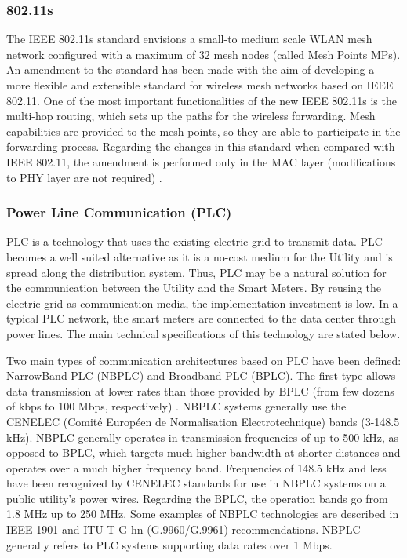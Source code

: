\documentclass[10pt,twocolumn,twoside,submit]{JCNtran}
\begin{document}
\subsubsection{802.11s}\label{tech::80211s}

The IEEE 802.11s standard envisions a small-to medium scale WLAN mesh network configured with a maximum of 32 mesh nodes (called Mesh Points MPs). An amendment to the standard has been made with the aim of developing a more flexible and extensible standard for wireless mesh networks based on IEEE 802.11. One of the most important functionalities of the new IEEE 802.11s is the multi-hop routing, which sets up the paths for the wireless forwarding. Mesh capabilities are provided to the mesh points, so they are able to participate in the forwarding process. Regarding the changes in this standard when compared with IEEE 802.11, the amendment is performed only in the MAC layer (modifications to PHY layer are not required) \cite{Bahr2006}.

\subsubsection{Power Line Communication (PLC)}\label{tech::plc}

PLC is a technology that uses the existing electric grid to transmit data. PLC becomes a well suited alternative as it is a no-cost medium for the Utility and is spread along the distribution system. Thus, PLC may be a natural solution for the communication between the Utility and the Smart Meters. By reusing the electric grid as communication media, the implementation investment is low. In a typical PLC network, the smart meters are connected to the data center through power lines. The main technical specifications of this technology are stated below.

Two main types of communication architectures based on PLC have been defined: NarrowBand PLC (NBPLC) and Broadband PLC (BPLC). The first type allows data transmission at lower rates than those provided by BPLC (from few dozens of kbps to 100 Mbps, respectively) \cite{Sabbah2014}. NBPLC systems generally use the CENELEC (Comit\'{e} Europ\'{e}en de Normalisation Electrotechnique) bands (3-148.5 kHz). NBPLC generally operates in transmission frequencies of up to 500 kHz, as opposed to BPLC, which targets much higher bandwidth at shorter distances and operates over a much higher frequency band. Frequencies of 148.5 kHz and less have been recognized by CENELEC standards for use in NBPLC systems on a public utility's power wires. Regarding the BPLC, the operation bands go from 1.8 MHz up to 250 MHz. Some examples of NBPLC technologies are described in IEEE 1901 and ITU-T G-hn (G.9960/G.9961) recommendations. NBPLC generally refers to PLC systems supporting data rates over 1 Mbps.
\end{document}
